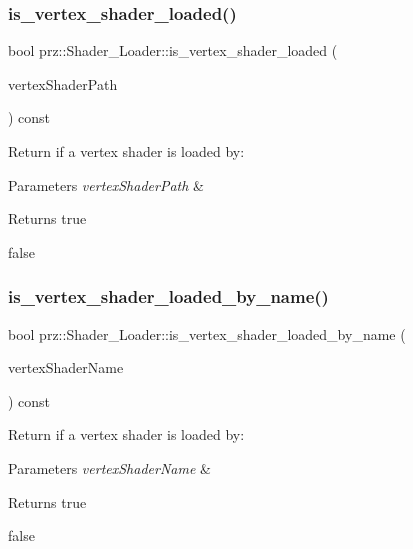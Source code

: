 \subsubsection{\texorpdfstring{is\_vertex\_shader\_loaded()}{is\_vertex\_shader\_loaded()}}
{\footnotesize\ttfamily bool prz\+::\+Shader\+\_\+\+Loader\+::is\+\_\+vertex\+\_\+shader\+\_\+loaded (\begin{DoxyParamCaption}\item[{const P\+String \&}]{vertex\+Shader\+Path }\end{DoxyParamCaption}) const\hspace{0.3cm}{\ttfamily [inline]}}



Return if a vertex shader is loaded by\+: 


\begin{DoxyParams}{Parameters}
{\em vertex\+Shader\+Path} & \\
\hline
\end{DoxyParams}
\begin{DoxyReturn}{Returns}
true 

false 
\end{DoxyReturn}
\mbox{\label{classprz_1_1_shader___loader_ade063fcef4098ddda048cc4281efd1af}} 
\subsubsection{\texorpdfstring{is\_vertex\_shader\_loaded\_by\_name()}{is\_vertex\_shader\_loaded\_by\_name()}}
{\footnotesize\ttfamily bool prz\+::\+Shader\+\_\+\+Loader\+::is\+\_\+vertex\+\_\+shader\+\_\+loaded\+\_\+by\+\_\+name (\begin{DoxyParamCaption}\item[{const P\+String \&}]{vertex\+Shader\+Name }\end{DoxyParamCaption}) const\hspace{0.3cm}{\ttfamily [inline]}}



Return if a vertex shader is loaded by\+: 


\begin{DoxyParams}{Parameters}
{\em vertex\+Shader\+Name} & \\
\hline
\end{DoxyParams}
\begin{DoxyReturn}{Returns}
true 

false 
\end{DoxyReturn}
\mbox{\label{classprz_1_1_shader___loader_a00a1b6d36b4266b59a98b5493e38ec8b}} 
